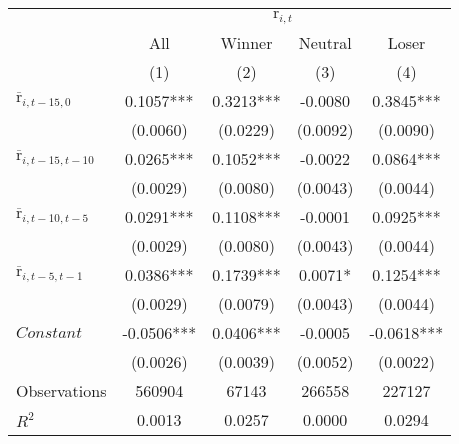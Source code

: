 \begin{tabular}{lcccc}
\toprule
 & \multicolumn{4}{c}{$\text{r}_{i,t}$} \\
\cmidrule{2-5}
 & All & Winner & Neutral & Loser\\
 & (1) & (2) & (3) & (4) \\
\midrule
$\overline{\text{r}}_{i,t-15,0}$ & 0.1057*** & 0.3213*** & -0.0080 & 0.3845*** \\
 & (0.0060) & (0.0229) & (0.0092) & (0.0090) \\
$\overline{\text{r}}_{i,t-15,t-10}$ & 0.0265*** & 0.1052*** & -0.0022 & 0.0864*** \\
 & (0.0029) & (0.0080) & (0.0043) & (0.0044) \\
$\overline{\text{r}}_{i,t-10,t-5}$ & 0.0291*** & 0.1108*** & -0.0001 & 0.0925*** \\
 & (0.0029) & (0.0080) & (0.0043) & (0.0044) \\
$\overline{\text{r}}_{i,t-5,t-1}$ & 0.0386*** & 0.1739*** & 0.0071* & 0.1254*** \\
 & (0.0029) & (0.0079) & (0.0043) & (0.0044) \\
$Constant$ & -0.0506*** & 0.0406*** & -0.0005 & -0.0618*** \\
 & (0.0026) & (0.0039) & (0.0052) & (0.0022) \\
\midrule
Observations & 560904 & 67143 & 266558 & 227127 \\
$R^2$ & 0.0013 & 0.0257 & 0.0000 & 0.0294 \\
\bottomrule
\end{tabular}